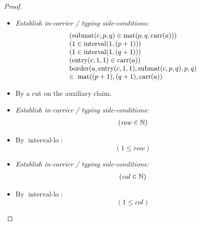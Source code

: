 \documentclass[11pt]{article}
\theoremstyle{plain}
\begin{document}
\begin{proof}
\begin{itemize}[leftmargin=2.8em, itemsep=4pt, parsep=1pt]
  \item[\textbf{9--13}] \emph{Establish in-carrier / typing side-conditions:}
\begin{equation*}
\begin{array}{@{}l@{}}
(\operatorname{submat}(c, p, q) \in \operatorname{mat}(p, q, \operatorname{carr}(a))) \\
(1 \in \operatorname{interval}(1, (p + 1))) \\
(1 \in \operatorname{interval}(1, (q + 1))) \\
(\operatorname{entry}(c, 1, 1) \in \operatorname{carr}(a)) \\
\begin{array}{@{}l@{}} \operatorname{border}(a, \operatorname{entry}(c, 1, 1), \operatorname{submat}(c, p, q), p, q) \\ \in\; \operatorname{mat}((p + 1), (q + 1), \operatorname{carr}(a)) \end{array}
\end{array}
\end{equation*}

  \item[\textbf{14}] By a cut on the auxiliary claim.
  \item[\textbf{15--16}] \emph{Establish in-carrier / typing side-conditions:}
\begin{equation*}
\begin{array}{@{}l@{}}
(\mathit{row} \in \mathbb{N})
\end{array}
\end{equation*}

  \item[\textbf{17}] By $\operatorname{interval\text{-}lo}$:
\begin{equation*}
(1 \leq \mathit{row})
\end{equation*}

  \item[\textbf{18}] \emph{Establish in-carrier / typing side-conditions:}
\begin{equation*}
\begin{array}{@{}l@{}}
(\mathit{col} \in \mathbb{N})
\end{array}
\end{equation*}

  \item[\textbf{19}] By $\operatorname{interval\text{-}lo}$:
\begin{equation*}
(1 \leq \mathit{col})
\end{equation*}


\end{itemize}
\end{proof}
\end{document}
